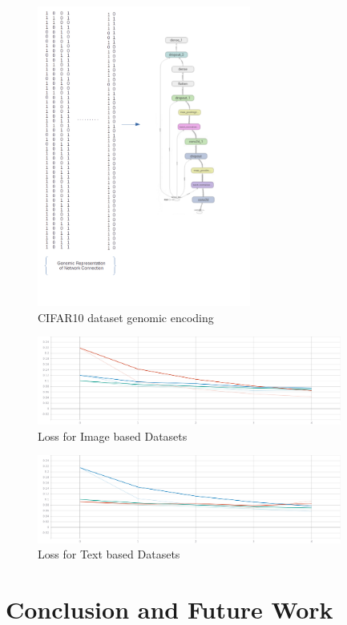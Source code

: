 \documentclass[conference]{IEEEtran}
\begin{document}
\begin{figure}[!b]
\centerline{\includegraphics[width=70mm]{cifar10.png}}
\caption{CIFAR10 dataset genomic encoding}
\label{10}
\end{figure}

\begin{figure}[!b]
\centerline{\includegraphics[width=100mm]{epoch_loss.png}}
\caption{Loss for Image based Datasets}
\label{conv_loss}
\end{figure}

\begin{figure}[!b]
\centerline{\includegraphics[width=100mm]{epoch_loss_2.png}}
\caption{Loss for Text based Datasets}
\label{text_loss}
\end{figure}



\section{Conclusion and Future Work}
\end{document}
